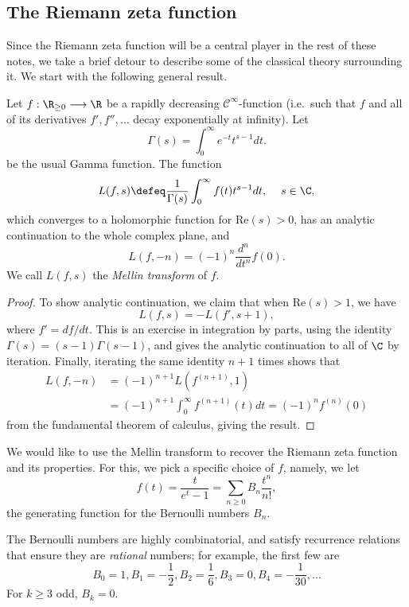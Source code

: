\documentclass[a4paper,10pt, english, reqno]{smfart}
\numberwithin{equation}{section}
\begin{document}
\subsection{The Riemann zeta function}\label{sec:riemann}
Since the Riemann zeta function will be a central player in the rest of these notes, we take a brief detour to describe some of the classical theory surrounding it. We start with the following general result. 

\begin{theorem}\label{thm:l-function}
Let $f : \R_{\geq 0} \longrightarrow \R$ be a rapidly decreasing $\mathscr{C}^\infty$-function (i.e.\ such that $f$ and all of its derivatives $f', f'', \ldots$ decay exponentially at infinity). Let 
\begin{equation} \label{EqGamma}
\Gamma(s) = \int_0^\infty e^{-t}t^{s-1} dt.
\end{equation}
	be the usual Gamma function. The function
	\[L(f,s) \defeq \frac{1}{\Gamma(s)}\int_0^\infty f(t)t^{s-1}dt, \hspace{12pt} s \in \C,\]
	which converges to a holomorphic function for Re$(s) > 0$, has an analytic continuation to the whole complex plane, and
	\[L(f,-n) = (-1)^n \frac{d^n}{dt^n}f(0).\]
	We call $L(f,s)$ the \emph{Mellin transform} of $f$.
\end{theorem}
\begin{proof}
	To show analytic continuation, we claim that when Re$(s) > 1$, we have
	\[
	L(f,s) = -L(f',s+1),
	\]
	where $f' = df/dt$. This is an exercise in integration by parts, using the identity $\Gamma(s) = (s-1)\Gamma(s-1)$, and gives the analytic continuation to all of $\C$ by iteration. Finally, iterating the same identity $n+1$ times shows that
	\begin{align*}
		L(f,-n) &= (-1)^{n+1}L(f^{(n+1)} ,1)\\
		& = (-1)^{n+1}\int_0^\infty f^{(n+1)}(t)dt = (-1)^nf^{(n)}(0)
	\end{align*}
	from the fundamental theorem of calculus, giving the result.
\end{proof}


We would like to use the Mellin transform to recover the Riemann zeta function and its properties. For this, we pick a specific choice of $f$, namely, we let
\[f(t) = \frac{t}{e^t - 1} = \sum_{n \geq 0}B_n \frac{t^n}{n!},\]
the generating function for the Bernoulli numbers $B_n$. 
\begin{remark}
The Bernoulli numbers are highly combinatorial, and satisfy  recurrence relations that ensure they are \emph{rational} numbers; for example, the first few are
\[
B_0 = 1, B_1 = -\frac{1}{2}, B_2 = \frac{1}{6}, B_3 = 0, B_4 =  -\frac{1}{30}, ...
\]
For $k \geq 3$ odd, $B_k = 0$.
\end{remark}
\end{document}
